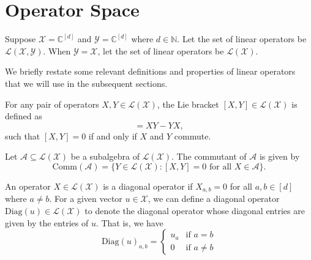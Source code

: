 \section{Operator Space}


Suppose $\mathcal{X} = \mathbb{C}^{[d]}$ and $\mathcal{Y} = \mathbb{C}^{[d]}$ where $d \in \mathbb{N}$.
Let the set of linear operators be $\mathcal{L}(\mathcal{X}, \mathcal{Y})$.
When $\mathcal{Y} = \mathcal{X}$, let the set of linear operators be $\mathcal{L}(\mathcal{X})$.

We briefly restate some relevant definitions and properties of linear operators that we will use in the subsequent sections.

\begin{remark}\label{remark:LieBracket}
For any pair of operators $X, Y \in \mathcal{L}(\mathcal{X})$, the Lie bracket $[X, Y] \in \mathcal{L}(\mathcal{X})$ is defined as
\begin{equation}
    [X, Y] = XY - YX,
\end{equation}
such that $[X, Y] = 0$ if and only if $X$ and $Y$ commute.

\end{remark}

\begin{remark}\label{remark:Commutant}
Let $\mathcal{A} \subseteq \mathcal{L}(\mathcal{X})$ be a subalgebra of $\mathcal{L}(\mathcal{X})$.
The commutant of $\mathcal{A}$ is given by
\begin{equation}
    \text{Comm}(\mathcal{A}) = \{Y \in \mathcal{L}(\mathcal{X}) : [X, Y] = 0 \text{ for all } X \in \mathcal{A}\}.
\end{equation}
\end{remark}

\begin{definition}\label{def:DiagonalOperators}
An operator $X \in \mathcal{L}(\mathcal{X})$ is a diagonal operator if $X_{a, b} = 0$ for all $a, b \in [d]$ where $a \neq b$.
For a given vector $u \in \mathcal{X}$, we can define a {diagonal operator} $\text{Diag}(u) \in \mathcal{L}(\mathcal{X})$ to denote the diagonal operator whose diagonal entries are given by the entries of $u$.
That is, we have
\begin{equation}
    \text{Diag}(u)_{a, b} = \begin{cases}
        u_a & \text{if } a = b \\
        0 & \text{if } a \neq b
    \end{cases}
\end{equation}
\end{definition}

